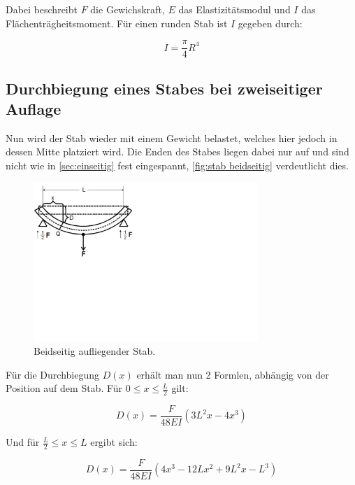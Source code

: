 Dabei beschreibt $F$ die Gewichskraft, $E$ das Elastizitätsmodul und $I$ das Flächenträgheitsmoment.
Für einen runden Stab ist $I$ gegeben durch:

\begin{equation}
    I=\frac{\pi}{4}R^{4}
    \label{eq:Flächenträgheitsmoment rund}
\end{equation}

\subsection{Durchbiegung eines Stabes bei zweiseitiger Auflage}
\label{sec:zweiseitig}

Nun wird der Stab wieder mit einem Gewicht belastet, welches hier jedoch in dessen Mitte platziert wird.
Die Enden des Stabes liegen dabei nur auf und sind nicht wie in \autoref{sec:einseitig} fest eingespannt,
\autoref{fig:stab beidseitig} verdeutlicht dies.

\begin{figure} [H]
    \centering
    \includegraphics[height=6cm]{content/Abbildungen/stab_beidseitig.pdf}
    \caption{Beidseitig aufliegender Stab. \cite{v103}}
    \label{fig:stab beidseitig}
\end{figure}

Für die Durchbiegung $D(x)$ erhält man nun 2 Formlen, abhängig von der Position auf dem Stab.
Für $0\leq x\leq \frac{L}{2}$ gilt:

\begin{equation}
    D(x)=\frac{F}{48EI}(3L^{2}x-4x^{3})
    \label{eq:Durchbiegung beidseitig 1}
\end{equation}

Und für $\frac{L}{2}\leq x\leq L$ ergibt sich:

\begin{equation}
    D(x)=\frac{F}{48EI}(4x^{3}-12Lx^{2}+9L^{2}x-L^{3})
    \label{eq:Durchbiegung beidseitig 2}
\end{equation}


